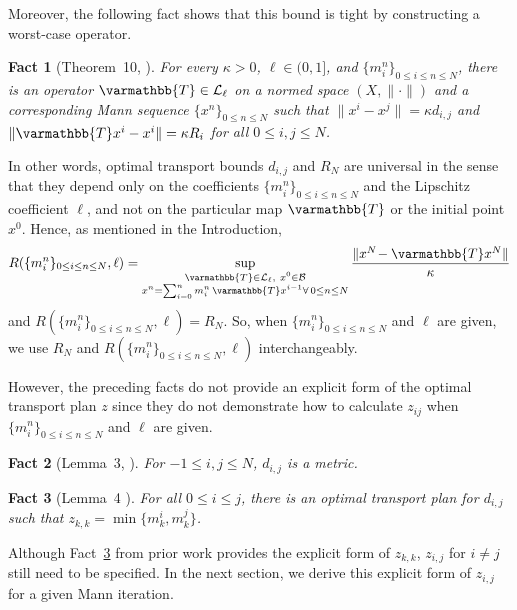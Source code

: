 \documentclass[pdflatex,sn-mathphys-num]{sn-jnl}%
\newcommand{\cB}{\mathcal{B}}
\newcommand{\cL}{\mathcal{L}}
\newcommand{\opT}{{\varmathbb{T}}}
\theoremstyle{thmstyleone}%
\theoremstyle{thmstyletwo}%
\newtheorem{fact}{Fact}
\theoremstyle{thmstylethree}%
\begin{document}
Moreover, the following fact shows that this bound is tight by constructing a worst-case operator.
\begin{fact}[Theorem~10, \cite{bravo2026minimax}]\label{fact:tightLip}
    For every $\kappa>0$, $\ell \in (0,1]$, and $\{m_i^n\}_{0\le i\le n\le N}$, there is an operator $\opT\in\cL_\ell$ on a normed space $(X, \|\cdot\|)$ and a corresponding Mann sequence $\{x^n\}_{0\le n\le N}$ such that $\|x^i-x^j\|=\kappa d_{i,j}$ and $\|\opT x^i-x^i\|=\kappa R_i$ for all $0\le i,j\le N$.
\end{fact}
In other words, optimal transport bounds \(d_{i,j}\) and
\(R_{N}\) are universal in the sense that they depend only on the coefficients $\{m^n_i\}_{0\le i \le n \le N}$ and the Lipschitz coefficient $\ell$, and not on the particular map \(\opT\) or the initial point \(x^{0}\). Hence, as mentioned in the Introduction, 
\[
R(\{m^n_i\}_{0 \le i \le n \le N}, \ell )=
\sup_{\substack{
\opT\in\cL_\ell,\ x^0\in\cB\\
x^n=\sum^n_{i=0}m^n_i\,\opT x^{i-1}\forall\,0\le n\le N
}}
\frac{\|x^N\!-\opT x^N\|}{\kappa}
\]
and $R(\{m^n_i\}_{0 \le i \le n \le N}, \ell)=R_N$. So, when $\{m^n_i\}_{0 \le i \le n \le N}$ and $\ell$ are given, we use $R_N$ and $R(\{m^n_i\}_{0 \le i \le n \le N}, \ell)$ interchangeably.


However, the preceding facts do not provide an explicit form of the optimal transport plan $z$ since they do not demonstrate how to calculate $z_{ij}$ when $\{m^n_i\}_{0\le i \le n \le N}$ and $\ell$ are given. 

\begin{fact}[Lemma~3, \cite{bravo2026minimax}]\label{metric}
    For $-1 \le i,j \le N$, $d_{i,j}$ is a metric.
\end{fact}
\begin{fact}[Lemma~4 \cite{bravo2026minimax}]\label{sim_opt}
    For all $0\leq i \leq j$, there is an optimal transport plan for $d_{i,j}$ such that $z_{k,k}=\min\{m_k^i,m_k^j\}$.
\end{fact}

Although Fact~\ref{sim_opt} from prior work \cite{bravo2026minimax} provides the explicit form of $z_{k,k}$, $z_{i,j}$ for $i\neq j$ still need to be specified.  In the next section, we derive this explicit form of $z_{i,j}$ for a given Mann iteration.
\end{document}
